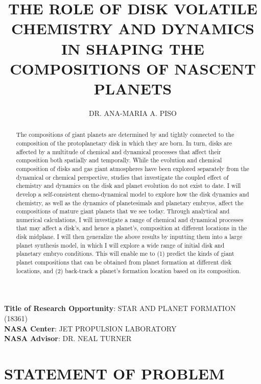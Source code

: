 \documentclass[12pt, letterpaper]{article}
\title{THE ROLE OF DISK VOLATILE CHEMISTRY AND DYNAMICS IN SHAPING THE COMPOSITIONS OF NASCENT PLANETS}  %
\author{DR. ANA-MARIA A. PISO}  %
\begin{document}
\maketitle

\doublespacing

\noindent
\textbf{Title of Research Opportunity}: STAR AND PLANET FORMATION (18361)\\
\smallskip
\noindent
\textbf{NASA Center}: JET PROPULSION LABORATORY\\
\smallskip
\noindent
\textbf{NASA Advisor}: DR. NEAL TURNER \\
\smallskip


\begin{abstract}


The compositions of giant planets are determined by and tightly connected to the composition of the protoplanetary disk in which they are born. In turn, disks are affected by a multitude of chemical and dynamical processes that affect their composition both spatially and temporally. While the evolution and chemical composition of disks and gas giant atmospheres have been explored separately from the dynamical or chemical perspective, studies that investigate the coupled effect of chemistry and dynamics on the disk and planet evolution do not exist to date. I will develop a self-consistent chemo-dynamical model to explore how the disk dynamics and chemistry, as well as the dynamics of planetesimals and planetary embryos, affect the compositions of mature giant planets that we see today. Through analytical and numerical calculations, I will investigate a range of chemical and dynamical processes that may affect a disk's, and hence a planet's, composition at different locations in the disk midplane. I will then generalize the above results by inputting them into a large planet synthesis model, in which I will explore a wide range of initial disk and planetary embryo conditions. This will enable me to (1) predict the kinds of giant planet compositions that can be obtained from planet formation at different disk locations, and (2) back-track a planet's formation location based on its composition. 
\end{abstract}

\section{STATEMENT OF PROBLEM}
\end{document}
